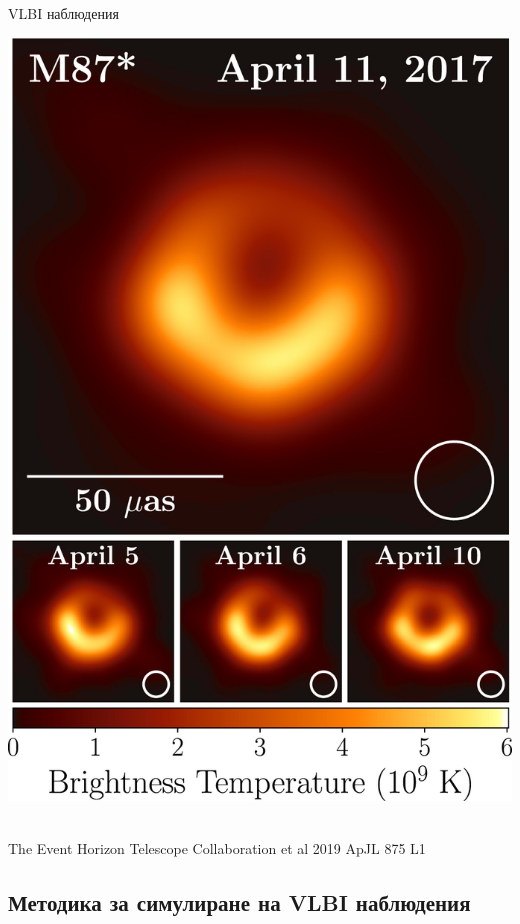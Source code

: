 \documentclass[hyperref={colorlinks,citecolor=blue,linkcolor=blue,urlcolor=blue}]{beamer}
\begin{document}
\begin{frame}{VLBI наблюдения}
\begin{minipage}{8em}
			\includegraphics[scale = 0.5]{Pre-Defence/M87.jpg}
		\end{minipage}\\
		
		\tiny The Event Horizon Telescope Collaboration et al 2019 ApJL 875 L1
		
	\end{frame}
	
	\subsection{Методика за симулиране на VLBI наблюдения}
	
\end{document}
